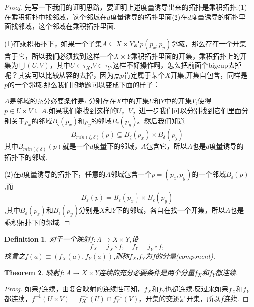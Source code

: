 \documentclass{article}
\newtheorem{theorem}{Theorem}[section]
\newtheorem{definition}[theorem]{Definition}
\newcommand*{\xfunc}[4]{{#2}\colon{#3}{#1}{#4}}
\newcommand*{\func}[3]{\xfunc{\to}{#1}{#2}{#3}}
\begin{document}

\begin{proof}
先写一下我们的证明思路，要证明上述度量诱导出来的拓扑是乘积拓扑:(1)在乘积拓扑中找邻域，这个邻域在$d$度量诱导的拓扑里面(2)在$d$度量诱导的拓扑里面找邻域，这个邻域在乘积拓扑里面.

(1)在乘积拓扑下，如果一个子集$A \subseteq X \times Y$是$p(p_x,p_y)$邻域，那么存在一个开集含于它，所以我们必须找到这样一个$X \times Y$乘积拓扑里面的开集，乘积拓扑上的开集为$\bigcup(U,V)$，其中$U \in \tau_X$,$V \in \tau_Y$.这样不好操作啊，怎么把前面个bigcup去掉呢？其实可以比较从容的去掉，因为点$p$肯定属于某个$X$开集,开集自包含，同样是$p$的一个邻域.那么我们的命题可以变成下面的样子：

$A$是邻域的充分必要条件是: 分别存在$X$中的开集$U$和$Y$中的开集$V$,使得$p \in U \times V \subseteq A$.如果我们能找到这样的$U$，$V$，进一步我们可以分别找到它们里面分别关于$p_x$的邻域$B_\zeta(p_x)$和$p_y$的邻域$B_\delta(p_y)$。然后我们知道\[B_{min(\zeta,\delta)}(p) \subseteq B_\zeta(p_x) \times B_\delta(p_y)\]其中$B_{min(\zeta,\delta)}(p)$就是一个$d$度量下的邻域，$A$包含它，所以$A$也是$d$度量诱导的拓扑下的邻域.

(2)在$d$度量诱导的拓扑下，任意的$A$邻域包含一个$p=(p_x,p_y)$的一个邻域$B_\varepsilon(p)$,而\[B_\varepsilon(p)=B_\varepsilon(p_x) \times B_\varepsilon(p_y)\],其中$B_\varepsilon(p_x)$和$B_\varepsilon(p_y)$分别是$X$和$Y$下的邻域，各自在找一个开集，所以$A$也是乘积拓扑下的邻域.
\end{proof}


\begin{definition}
对于一个映射$\func{f}{A}{X \times Y}$,设\[f_X = j_X \circ f, \quad f_Y = j_Y \circ f,\]换言之$f(a) \equiv (f_X(a),f_Y(a))$,则称$f_X$,$f_Y$为$f$的分量(component).
\end{definition}

\begin{theorem}
映射$\func{f}{A}{X \times Y}$连续的充分必要条件是两个分量$f_X$和$f_Y$都连续.
\end{theorem}

\begin{proof}
如果$f$连续，由复合映射的连续性可知，$f_X$和$f_Y$也都连续.反过来如果$f_X$和$f_Y$都连续，$f^{-1}(U \times V)=f_X^{-1}(U) \cap f_Y^{-1}(V)$，开集的交还是开集，所以$f$连续.
\end{proof}
\end{document}
